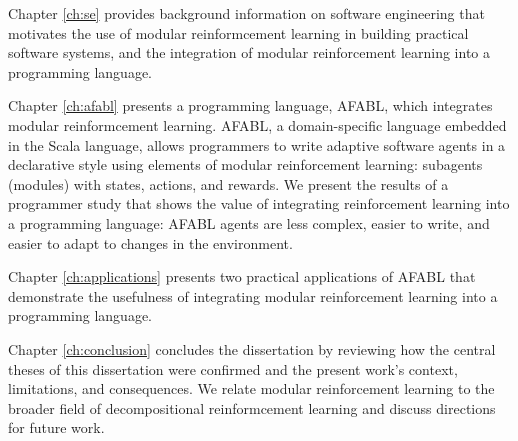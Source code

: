Chapter \ref{ch:se} provides background information on software engineering that motivates the use of modular reinformcement learning in building practical software systems, and the integration of modular reinforcement learning into a programming language.

Chapter \ref{ch:afabl} presents a programming language, AFABL, which integrates modular reinformcement learning. AFABL, a domain-specific language embedded in the Scala language, allows programmers to write adaptive software agents in a declarative style using elements of modular reinforcement learning: subagents (modules) with states, actions, and rewards. We present the results of a programmer study that shows the value of integrating reinforcement learning into a programming language: AFABL agents are less complex, easier to write, and easier to adapt to changes in the environment.

Chapter \ref{ch:applications} presents two practical applications of AFABL that demonstrate the usefulness of integrating modular reinforcement learning into a programming language.

Chapter \ref{ch:conclusion} concludes the dissertation by reviewing how the central theses of this dissertation were confirmed and the present work's context, limitations, and consequences. We relate modular reinforcement learning to the broader field of decompositional reinformcement learning and discuss directions for future work.
